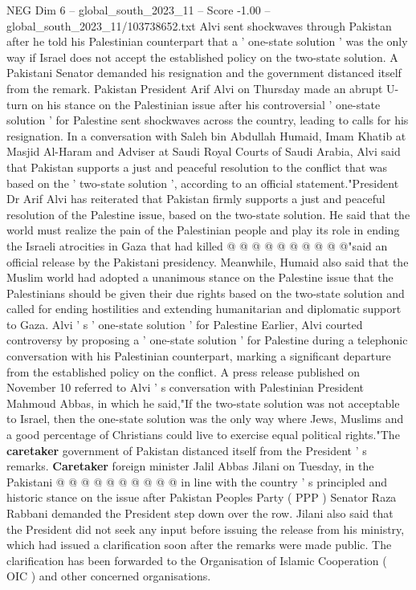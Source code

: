 \begin{textsample}{NEG Dim 6 – global\_south\_2023\_11 – Score -1.00 – global\_south\_2023\_11/103738652.txt}  \label{ex:f6_neg_189}
Alvi sent shockwaves through Pakistan after he told his Palestinian counterpart that a ' one-state solution ' was the only way if Israel does not accept the established policy on the two-state solution.
A Pakistani Senator demanded his resignation and the government distanced itself from the remark.
Pakistan President Arif Alvi on Thursday made an abrupt U-turn on his stance on the Palestinian issue after his controversial ' one-state solution ' for Palestine sent shockwaves across the country, leading to calls for his resignation.
In a conversation with Saleh bin Abdullah Humaid, Imam Khatib at Masjid Al-Haram and Adviser at Saudi Royal Courts of Saudi Arabia, Alvi said that Pakistan supports a just and peaceful resolution to the conflict that was based on the ' two-state solution ', according to an official statement."President Dr Arif Alvi has reiterated that Pakistan firmly supports a just and peaceful resolution of the Palestine issue, based on the two-state solution.
He said that the world must realize the pain of the Palestinian people and play its role in ending the Israeli atrocities in Gaza that had killed @ @ @ @ @ @ @ @ @ @"said an official release by the Pakistani presidency.
Meanwhile, Humaid also said that the Muslim world had adopted a unanimous stance on the Palestine issue that the Palestinians should be given their due rights based on the two-state solution and called for ending hostilities and extending humanitarian and diplomatic support to Gaza.
Alvi ' s ' one-state solution ' for Palestine Earlier, Alvi courted controversy by proposing a ' one-state solution ' for Palestine during a telephonic conversation with his Palestinian counterpart, marking a significant departure from the established policy on the conflict.
A press release published on November 10 referred to Alvi ' s conversation with Palestinian President Mahmoud Abbas, in which he said,"If the two-state solution was not acceptable to Israel, then the one-state solution was the only way where Jews, Muslims and a good percentage of Christians could live to exercise equal political rights."The \textbf{caretaker} government of Pakistan distanced itself from the President ' s remarks. \textbf{Caretaker} foreign minister Jalil Abbas Jilani on Tuesday, in the Pakistani @ @ @ @ @ @ @ @ @ @ in line with the country ' s principled and historic stance on the issue after Pakistan Peoples Party ( PPP ) Senator Raza Rabbani demanded the President step down over the row.
Jilani also said that the President did not seek any input before issuing the release from his ministry, which had issued a clarification soon after the remarks were made public.
The clarification has been forwarded to the Organisation of Islamic Cooperation ( OIC ) and other concerned organisations.

\end{textsample}
